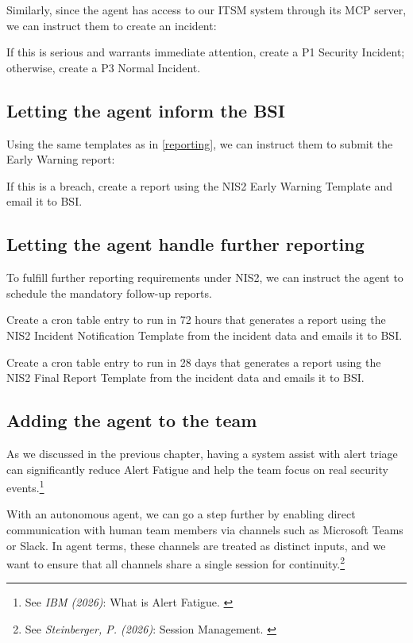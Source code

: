 Similarly, since the agent has access to our ITSM system through its MCP server, we can instruct them to create an incident:

\indent\colorbox{codegrey}{
    \parbox{0.8\linewidth}{
If this is serious and warrants immediate attention, create a P1 Security Incident; otherwise, create a P3 Normal Incident.
     }
}

\subsection{Letting the agent inform the BSI}

Using the same templates as in \ref{reporting}, we can instruct them to submit the Early Warning report:

\indent\colorbox{codegrey}{
    \parbox{0.8\linewidth}{
If this is a breach, create a report using the NIS2 Early Warning Template and email it to BSI.
     }
}

\subsection{Letting the agent handle further reporting}

To fulfill further reporting requirements under NIS2, we can instruct the agent to schedule the mandatory follow-up reports.

\indent\colorbox{codegrey}{
    \parbox{0.8\linewidth}{
Create a cron table entry to run in 72 hours that generates a report using the NIS2 Incident Notification Template from the incident data and emails it to BSI.
     }
}

\indent\colorbox{codegrey}{
    \parbox{0.8\linewidth}{
Create a cron table entry to run in 28 days that generates a report using the NIS2 Final Report Template from the incident data and emails it to BSI.
     }
}

\subsection{Adding the agent to the team}

As we discussed in the previous chapter, having a system assist with alert triage can significantly reduce Alert Fatigue and help the team focus on real security events.\footnote{See \textit{IBM (2026)}: What is Alert Fatigue. \cite{alertFatigue}}

With an autonomous agent, we can go a step further by enabling direct communication with human team members via channels such as Microsoft Teams or Slack. In agent terms, these channels are treated as distinct inputs, and we want to ensure that all channels share a single session for continuity.\footnote{See \textit{Steinberger, P. (2026)}: Session Management. \cite{clawSession}}

